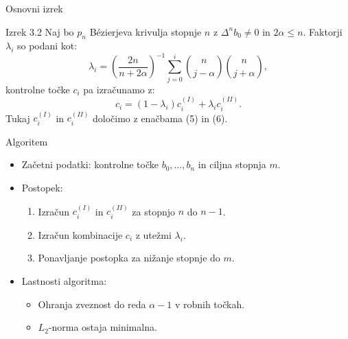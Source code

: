 \documentclass{beamer}
\begin{document}
\begin{frame}{Osnovni izrek}
    \begin{block}{Izrek 3.2}
        Naj bo $p_n$ Bézierjeva krivulja stopnje $n$ z $\Delta^n b_0 \neq 0$ in $2\alpha \leq n$. 
        Faktorji $\lambda_i$ so podani kot:
        \[ \lambda_i = \left(\frac{2n}{n + 2\alpha}\right)^{-1} \sum_{j=0}^i \binom{n}{j - \alpha} \binom{n}{j + \alpha}, \]
        \noindent kontrolne točke $c_i$ pa izračunamo z:
        \[ c_i = (1 - \lambda_i)c_i^{(I)} + \lambda_i c_i^{(II)}. \]
        Tukaj $c_i^{(I)}$ in $c_i^{(II)}$ določimo z enačbama (5) in (6).
    \end{block}
\end{frame}

\begin{frame}{Algoritem}
    \begin{itemize}
        \item Začetni podatki: kontrolne točke $b_0, \ldots, b_n$ in ciljna stopnja $m$.
        \item Postopek:
        \begin{enumerate}
            \item Izračun $c_i^{(I)}$ in $c_i^{(II)}$ za stopnjo $n$ do $n-1$.
            \item Izračun kombinacije $c_i$ z utežmi $\lambda_i$.
            \item Ponavljanje postopka za nižanje stopnje do $m$.
        \end{enumerate}
        \item Lastnosti algoritma:
        \begin{itemize}
            \item Ohranja zveznost do reda $\alpha-1$ v robnih točkah.
            \item $L_2$-norma ostaja minimalna.
        \end{itemize}
    \end{itemize}
\end{frame}
\end{document}
